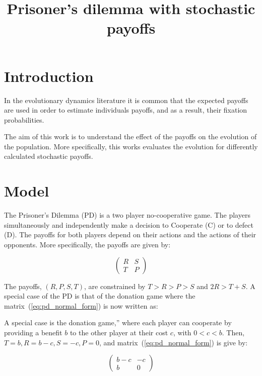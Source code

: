 \documentclass[11pt]{article}
\title{\begin{center}
\bf  \sffamily \LARGE Prisoner's dilemma with stochastic payoffs\\[-1cm]
\end{center}}
\date{}
\author{}
\theoremstyle{plainCl1}
\theoremstyle{plainCl2}
\begin{document}
\maketitle

\section{Introduction}

In the evolutionary dynamics literature it is common that the expected payoffs are
used in order to estimate individuals payoffs, and as a result, their fixation
probabilities.

The aim of this work is to understand the effect of the payoffs on the evolution
of the population. More specifically, this works evaluates the evolution for differently
calculated stochastic payoffs.

\section{Model}

The Prisoner's Dilemma (PD) is a two player no-cooperative game. The players
simultaneously and independently make a decision to Cooperate (C) or to defect
(D). The payoffs for both players depend on their actions and the actions of
their opponents. More specifically, the payoffs are given by:

\begin{equation}\label{eq:pd_normal_form}
    \begin{pmatrix}
        R & S  \\
        T & P
    \end{pmatrix}
\end{equation}

The payoffs, \((R, P, S, T)\), are constrained by \(T > R > P > S\) and \(2R > T + S\).
A special case of the PD is that of the donation game where the matrix~(\ref{eq:pd_normal_form})
is now written as:

A special case is the donation game,” where each player can cooperate by providing 
a benefit \(b\) to the other player at their cost \(c\), with \(0 < c < b\).
Then, \(T=b, R=b-c, S=-c, P=0\), and matrix~(\ref{eq:pd_normal_form}) is give by:

\begin{equation}\label{eq:donation_normal_form}
    \begin{pmatrix}
        b-c & -c  \\
        b & 0
    \end{pmatrix}
\end{equation}
\end{document}

